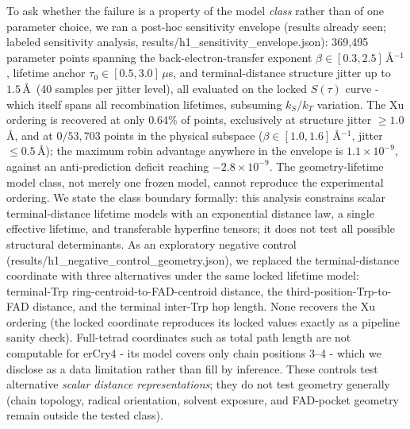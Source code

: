 \documentclass[12pt,a4paper]{article}
\begin{document}
To ask whether the failure is a property of the model \emph{class} rather than of one parameter choice, we ran a post-hoc sensitivity envelope (results already seen; labeled sensitivity analysis, results/h1\_sensitivity\_envelope.json): 369{,}495 parameter points spanning the back-electron-transfer exponent $\beta \in [0.3, 2.5]$\,\AA$^{-1}$, lifetime anchor $\tau_0 \in [0.5, 3.0]\,\mu$s, and terminal-distance structure jitter up to $1.5$\,\AA\ (40 samples per jitter level), all evaluated on the locked $S(\tau)$ curve - which itself spans all recombination lifetimes, subsuming $k_S/k_T$ variation. The Xu ordering is recovered at only $0.64\%$ of points, exclusively at structure jitter $\ge 1.0$\,\AA, and at $0/53{,}703$ points in the physical subspace ($\beta \in [1.0,1.6]$\,\AA$^{-1}$, jitter $\le 0.5$\,\AA); the maximum robin advantage anywhere in the envelope is $1.1\times10^{-9}$, against an anti-prediction deficit reaching $-2.8\times10^{-9}$. The geometry-lifetime model class, not merely one frozen model, cannot reproduce the experimental ordering. We state the class boundary formally: this analysis constrains scalar terminal-distance lifetime models with an exponential distance law, a single effective lifetime, and transferable hyperfine tensors; it does not test all possible structural determinants. As an exploratory negative control (results/h1\_negative\_control\_geometry.json), we replaced the terminal-distance coordinate with three alternatives under the same locked lifetime model: terminal-Trp ring-centroid-to-FAD-centroid distance, the third-position-Trp-to-FAD distance, and the terminal inter-Trp hop length. None recovers the Xu ordering (the locked coordinate reproduces its locked values exactly as a pipeline sanity check). Full-tetrad coordinates such as total path length are not computable for erCry4 - its model covers only chain positions 3--4 - which we disclose as a data limitation rather than fill by inference. These controls test alternative \emph{scalar distance representations}; they do not test geometry generally (chain topology, radical orientation, solvent exposure, and FAD-pocket geometry remain outside the tested class).
\end{document}

